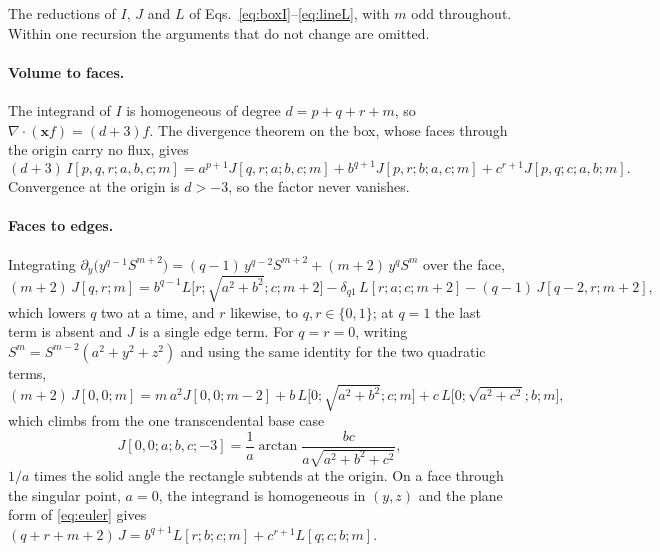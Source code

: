 \documentclass[11pt,a4paper]{article}
\begin{document}
The reductions of $I$, $J$ and $L$ of Eqs.~\eqref{eq:boxI}--\eqref{eq:lineL}, with $m$ odd throughout.
Within one recursion the arguments that do not change are omitted.

\paragraph{Volume to faces.} The integrand of $I$ is homogeneous of degree $d=p+q+r+m$, so
$\nabla\cdot(\mathbf{x}f)=(d+3)f$. The divergence theorem on the box, whose faces through the origin
carry no flux, gives
\begin{equation}\label{eq:euler}
  (d+3)\,I[p,q,r;a,b,c;m]=a^{p+1}J[q,r;a;b,c;m]+b^{q+1}J[p,r;b;a,c;m]+c^{r+1}J[p,q;c;a,b;m].
\end{equation}
Convergence at the origin is $d>-3$, so the factor never vanishes.

\paragraph{Faces to edges.} Integrating
$\partial_y\bigl(y^{q-1}S^{m+2}\bigr)=(q-1)\,y^{q-2}S^{m+2}+(m+2)\,y^qS^m$ over the face,
\begin{equation}\label{eq:facerec}
  (m+2)\,J[q,r;m]=b^{q-1}L\bigl[r;\sqrt{a^2+b^2};c;m+2\bigr]-\delta_{q1}\,L[r;a;c;m+2]-(q-1)\,J[q-2,r;m+2],
\end{equation}
which lowers $q$ two at a time, and $r$ likewise, to $q,r\in\{0,1\}$; at $q=1$ the last term is absent and
$J$ is a single edge term. For $q=r=0$, writing $S^m=S^{m-2}(a^2+y^2+z^2)$ and using the same identity for
the two quadratic terms,
\begin{equation}\label{eq:j00}
  (m+2)\,J[0,0;m]=m\,a^2J[0,0;m-2]+b\,L\bigl[0;\sqrt{a^2+b^2};c;m\bigr]+c\,L\bigl[0;\sqrt{a^2+c^2};b;m\bigr],
\end{equation}
which climbs from the one transcendental base case
\begin{equation}\label{eq:solidangle}
  J[0,0;a;b,c;-3]=\frac1a\arctan\frac{bc}{a\sqrt{a^2+b^2+c^2}},
\end{equation}
$1/a$ times the solid angle the rectangle subtends at the origin. On a face through the singular point,
$a=0$, the integrand is homogeneous in $(y,z)$ and the plane form of \eqref{eq:euler} gives
$(q+r+m+2)\,J=b^{q+1}L[r;b;c;m]+c^{r+1}L[q;c;b;m]$.
\end{document}
